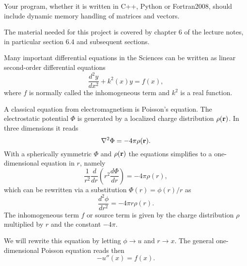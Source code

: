 \documentclass[11pt,a4wide]{article}
\begin{document}
Your program, whether it is written in C++, Python 
or Fortran2008, should include
dynamic memory handling of matrices and vectors. 

The material needed for this project is covered by chapter 6 of the lecture notes, in particular section 6.4 and subsequent sections.



Many important differential equations in the Sciences can be written as 
linear second-order differential equations 
\[
\frac{d^2y}{dx^2}+k^2(x)y = f(x),
\]
where $f$ is normally called the inhomogeneous term and $k^2$ is a real function.

A classical equation from electromagnetism is Poisson's equation.
The electrostatic potential $\Phi$ is generated by a localized charge
distribution $\rho ({\bf r})$.   In three dimensions 
it reads
\[
\nabla^2 \Phi = -4\pi \rho ({\bf r}).
\]
With a spherically symmetric $\Phi$ and $\rho ({\bf r})$  the equations
simplifies to a one-dimensional equation in $r$, namely
\[
\frac{1}{r^2}\frac{d}{dr}\left(r^2\frac{d\Phi}{dr}\right) = -4\pi \rho(r),
\]
which can be rewritten via a substitution $\Phi(r)= \phi(r)/r$ as
\[
\frac{d^2\phi}{dr^2}= -4\pi r\rho(r).
\]
The inhomogeneous term $f$ or source term is given by the charge distribution
$\rho$  multiplied by $r$ and the constant $-4\pi$.

We will rewrite this equation by letting $\phi\rightarrow u$ and 
$r\rightarrow x$. 
The general one-dimensional Poisson equation reads then 
\[
-u''(x) = f(x).
\]
\end{document}
